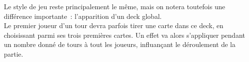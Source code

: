         Le style de jeu reste principalement le même, mais on notera toutefois une
        différence importante : l'apparition d'un deck global. \\
        Le premier joueur d'un tour devra parfois tirer une carte dans ce deck, en
        choisissant parmi ses trois premières cartes. Un effet va alors s'appliquer
        pendant un nombre donné de tours à tout les joueurs, influançant le déroulement
        de la partie.
